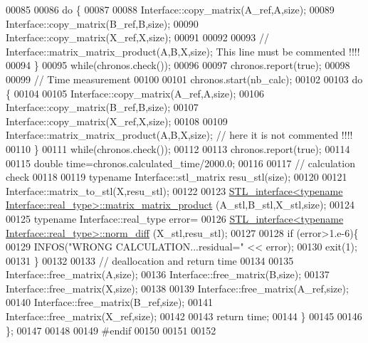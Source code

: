\begin{DoxyCode}
00085 
00086     \textcolor{keywordflow}{do} \{
00087 
00088       Interface::copy\_matrix(A\_ref,A,size);
00089       Interface::copy\_matrix(B\_ref,B,size);
00090       Interface::copy\_matrix(X\_ref,X,size);
00091 
00092 
00093       \textcolor{comment}{//      Interface::matrix\_matrix\_product(A,B,X,size); This line must be commented !!!!}
00094     \}
00095     \textcolor{keywordflow}{while}(chronos.check());
00096 
00097     chronos.report(\textcolor{keyword}{true});
00098 
00099     \textcolor{comment}{// Time measurement}
00100 
00101     chronos.start(nb\_calc);
00102 
00103     \textcolor{keywordflow}{do} \{
00104 
00105       Interface::copy\_matrix(A\_ref,A,size);
00106       Interface::copy\_matrix(B\_ref,B,size);
00107       Interface::copy\_matrix(X\_ref,X,size);
00108 
00109       Interface::matrix\_matrix\_product(A,B,X,size); \textcolor{comment}{// here it is not commented !!!!}
00110     \}
00111     \textcolor{keywordflow}{while}(chronos.check());
00112 
00113     chronos.report(\textcolor{keyword}{true});
00114 
00115     \textcolor{keywordtype}{double} time=chronos.calculated\_time/2000.0;
00116 
00117     \textcolor{comment}{// calculation check}
00118 
00119     \textcolor{keyword}{typename} Interface::stl\_matrix resu\_stl(size);
00120 
00121     Interface::matrix\_to\_stl(X,resu\_stl);
00122 
00123     \hyperlink{class_s_t_l__interface}{STL\_interface<typename Interface::real\_type>::matrix\_matrix\_product}
      (A\_stl,B\_stl,X\_stl,size);
00124 
00125     \textcolor{keyword}{typename} Interface::real\_type error=
00126       \hyperlink{class_s_t_l__interface}{STL\_interface<typename Interface::real\_type>::norm\_diff}
      (X\_stl,resu\_stl);
00127 
00128     \textcolor{keywordflow}{if} (error>1.e-6)\{
00129       INFOS(\textcolor{stringliteral}{"WRONG CALCULATION...residual="} << error);
00130       exit(1);
00131     \}
00132 
00133     \textcolor{comment}{// deallocation and return time}
00134 
00135     Interface::free\_matrix(A,size);
00136     Interface::free\_matrix(B,size);
00137     Interface::free\_matrix(X,size);
00138 
00139     Interface::free\_matrix(A\_ref,size);
00140     Interface::free\_matrix(B\_ref,size);
00141     Interface::free\_matrix(X\_ref,size);
00142 
00143     \textcolor{keywordflow}{return} time;
00144   \}
00145 
00146 \};
00147 
00148 
00149 \textcolor{preprocessor}{#endif}
00150 
00151 
00152 
\end{DoxyCode}

